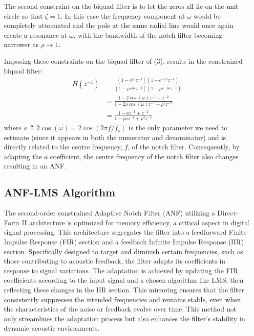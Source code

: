 The second constraint on the biquad filter is to let the zeros all lie on the unit circle so that $\zeta=1$. In this case the frequency component at $\omega$ would be completely attenuated and the pole at the same radial line would once again create a resonance at $\omega$, with the bandwidth of the notch filter becoming narrower as $\rho \rightarrow 1$.

Imposing these constraints on the biquad filter of (3), results in the constrained biquad filter:
\begin{equation}
    \begin{aligned}
     H\left(z^{-1}\right) & =\frac{\left(1-e^{j \omega} z^{-1}\right)\left(1-e^{-j \omega} z^{-1}\right)}{\left(1-\rho e^{j \omega} z^{-1}\right)\left(1-\rho e^{-j \omega} z^{-1}\right)} \\
    & =\frac{1-2 \cos (\omega) z^{-1}+z^{-2}}{1-2 \rho \cos (\omega) z^{-1}+\rho^2 z^{-2}} \\
    & =\frac{1-a z^{-1}+z^{-2}}{1-\rho a z^{-1}+\rho^2 z^{-2}}
    \end{aligned}
\end{equation}
where $a \triangleq 2 \cos (\omega)=2 \cos \left(2 \pi f / f_s\right)$ is the only parameter we need to estimate (since it appears in both the numerator and denominator) and is directly related to the centre frequency, $f$, of the notch filter. Consequently, by adapting the $a$ coefficient, the centre frequency of the notch filter also changes resulting in an ANF.\cite{ali2023frequency}

\subsection{ANF-LMS Algorithm}

The second-order constrained Adaptive Notch Filter (ANF) utilizing a Direct-Form II architecture is optimized for memory efficiency, a critical aspect in digital signal processing. This architecture segregates the filter into a feedforward Finite Impulse Response (FIR) section and a feedback Infinite Impulse Response (IIR) section. Specifically designed to target and diminish certain frequencies, such as those contributing to acoustic feedback, the filter adapts its coefficients in response to signal variations. The adaptation is achieved by updating the FIR coefficients according to the input signal and a chosen algorithm like LMS, then reflecting these changes in the IIR section. This mirroring ensures that the filter consistently suppresses the intended frequencies and remains stable, even when the characteristics of the noise or feedback evolve over time. This method not only streamlines the adaptation process but also enhances the filter's stability in dynamic acoustic environments.

